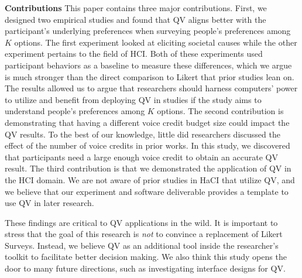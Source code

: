 \textbf{Contributions}
This paper contains three major contributions.
First, we designed two empirical studies and found that QV aligns better with the participant's underlying preferences when surveying people's preferences among $K$ options. The first experiment looked at eliciting societal causes while the other experiment pertains to the field of HCI. Both of these experiments used participant behaviors as a baseline to measure these differences, which we argue is much stronger than the direct comparison to Likert that prior studies lean on. The results allowed us to argue that researchers should harness computers' power to utilize and benefit from deploying QV in studies if the study aims to understand people's preferences among $K$ options. 
The second contribution is demonstrating that having a different voice credit budget size could impact the QV results. To the best of our knowledge, little did researchers discussed the effect of the number of voice credits in prior works. In this study, we discovered that participants need a large enough voice credit to obtain an accurate QV result.
The third contribution is that we demonstrated the application of QV in the HCI domain. We are not aware of prior studies in HaCI that utilize QV, and we believe that our experiment and software deliverable provides a template to use QV in later research.

These findings are critical to QV applications in the wild. It is important to stress that the goal of this research is \textit{not} to convince a replacement of Likert Surveys. Instead, we believe QV as an additional tool inside the researcher's toolkit to facilitate better decision making. We also think this study opens the door to many future directions, such as investigating interface designs for QV.





